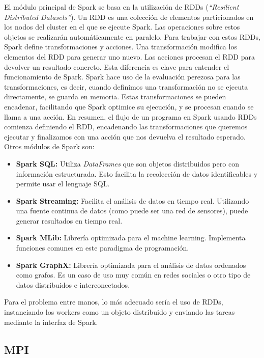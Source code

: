 El módulo principal de Spark se basa en la utilización de RDDs (\textit{``Resilient Distributed Datasets''}). Un RDD es una colección de elementos particionados en los nodos del cluster en el que se ejecute Spark. Las operaciones sobre estos objetos se realizarán automáticamente en paralelo. Para trabajar con estos RDDs, Spark define transformaciones y acciones. Una transformación modifica los elementos del RDD para generar uno nuevo. Las acciones procesan el RDD para devolver un resultado concreto. Esta diferencia es clave para entender el funcionamiento de Spark. Spark hace uso de la evaluación perezosa para las transformaciones, es decir, cuando definimos una transformación no se ejecuta directamente, se guarda en memoria. Estas transformaciones se pueden encadenar, facilitando que Spark optimice su ejecución, y se procesan cuando se llama a una acción. 
En resumen, el flujo de un programa en Spark usando RDDs comienza definiendo el RDD, encadenando las transformaciones que queremos ejecutar y finalizamos con una acción que nos devuelva el resultado esperado.\\

Otros módulos de Spark son:

\begin{itemize}
    \item \textbf{Spark SQL: } Utiliza \textit{DataFrames} que son objetos distribuidos pero con información estructurada. Esto facilita la recolección de datos identificables y permite usar el lenguaje SQL.
    \item \textbf{Spark Streaming: } Facilita el análisis de datos en tiempo real. Utilizando una fuente continua de datos (como puede ser una red de sensores), puede generar resultados en tiempo real.
    \item \textbf{Spark MLib: } Librería optimizada para el machine learning. Implementa funciones comunes en este paradigma de programación.
    \item \textbf{Spark GraphX: } Librería optimizada para el análisis de datos ordenados como grafos. Es un caso de uso muy común en redes sociales o otro tipo de datos distribuidos e interconectados.
\end{itemize}

Para el problema entre manos, lo más adecuado sería el uso de RDDs, instanciando los workers como un objeto distribuido y enviando las tareas mediante la interfaz de Spark.

\subsection{MPI}

